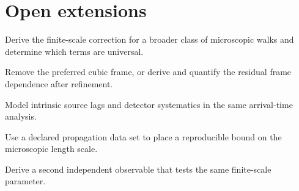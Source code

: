 \section{Open extensions}
\begin{nextsteps}
\item Derive the finite-scale correction for a broader class of microscopic walks and determine which terms are universal.
\item Remove the preferred cubic frame, or derive and quantify the residual frame dependence after refinement.
\item Model intrinsic source lags and detector systematics in the same arrival-time analysis.
\item Use a declared propagation data set to place a reproducible bound on the microscopic length scale.
\item Derive a second independent observable that tests the same finite-scale parameter.
\end{nextsteps}
